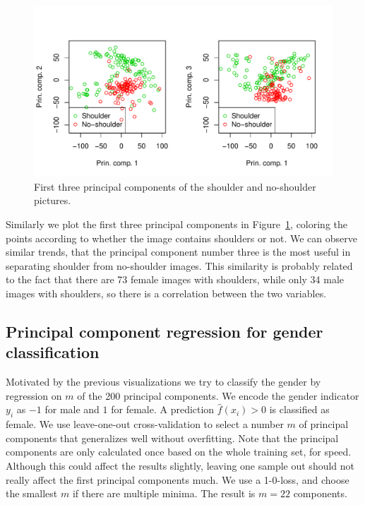\documentclass[a4paper]{article}\usepackage[]{graphicx}\usepackage[]{color}
\makeatletter
\def\maxwidth{ %
  \ifdim\Gin@nat@width>\linewidth
    \linewidth
  \else
    \Gin@nat@width
  \fi
}
\newenvironment{knitrout}{}{} %
\makeatother
\begin{document}
\begin{knitrout}
\color{fgcolor}\begin{figure}
\includegraphics[width=\maxwidth]{figure/shoulder_components-1} \caption[First three principal components of the shoulder and no-shoulder pictures]{First three principal components of the shoulder and no-shoulder pictures.}\label{fig:shoulder_components}
\end{figure}


\end{knitrout}

Similarly we plot the first three principal components in Figure~\ref{fig:shoulder_components}, coloring the points according to whether the image contains shoulders or not. We can observe similar trends, that the principal component number three is the most useful in separating shoulder from no-shoulder images. This similarity is probably related to the fact that there are 73 female images with shoulders, while only 34 male images with shoulders, so there is a correlation between the two variables.

\subsection{Principal component regression for gender classification}





Motivated by the previous visualizations we try to classify the gender by regression on $m$ of the 200 principal components. We encode the gender indicator $y_i$ as $-1$ for male and $1$ for female. A prediction $\hat{f}(x_i) > 0$ is classified as female. We use leave-one-out cross-validation to select a number $m$ of principal components that generalizes well without overfitting. Note that the principal components are only calculated once based on the whole training set, for speed. Although this could affect the results slightly, leaving one sample out should not really affect the first principal components much. We use a 1-0-loss, and choose the smallest $m$ if there are multiple minima. The result is $m = 22$ components.
\end{document}
